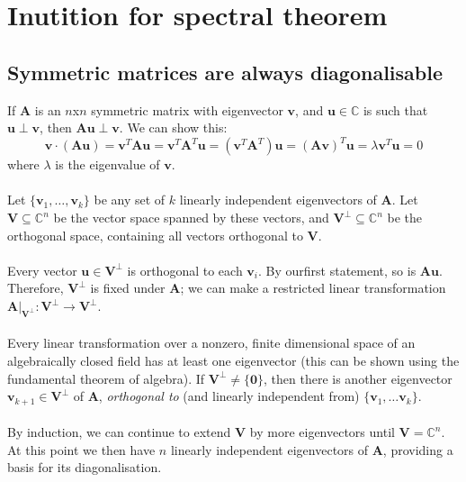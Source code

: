 \documentclass{report}
\begin{document}
\section{Inutition for spectral theorem}
\subsection{Symmetric matrices are always diagonalisable}
If $\bm A$ is an $n$x$n$ symmetric matrix with eigenvector $\bm v$, and $\bm u\in\mathbb{C}$ is such that $\bm u\perp\bm v$, then 
$\bm{Au}\perp\bm v$. We can show this:
\begin{equation*}
\bm v\cdot(\bm{Au})=\bm v^T\bm{Au}=\bm v^T\bm A^T\bm u=(\bm v^T\bm A^T)\bm u=(\bm A\bm v)^T\bm u
=\lambda\bm v^T\bm u=0
\end{equation*}
where $\lambda$ is the eigenvalue of $\bm v$.\\
\vspace{1mm}\\
Let $\{\bm v_1,\ldots,\bm v_k\}$ be any set of $k$ linearly independent eigenvectors of $\bm A$. Let $\bm V\subseteq\mathbb C^n$ be the vector
space spanned by these vectors, and $\bm V^\perp\subseteq\mathbb C^n$ be the orthogonal space, containing all vectors orthogonal to $\bm V$.\\
\vspace{1mm}\\
Every vector $\bm u\in\bm V^\perp$ is orthogonal to each $\bm v_i$. By ourfirst statement, so is $\bm{Au}$. Therefore, $\bm V^\perp$ is fixed under
$\bm A$; we can make a restricted linear transformation $\bm A|_{\bm V^\perp}:\bm V^\perp\to\bm V^\perp$.\\
\vspace{1mm}\\
Every linear transformation over a nonzero, finite dimensional space of an algebraically closed field has at least one eigenvector (this can be 
shown using the fundamental theorem of algebra). If $\bm V^\perp\neq\{\bm 0\}$, then there is another eigenvector $\bm v_{k+1}\in\bm V^\perp$ of
$\bm A$, \textit{orthogonal to} (and linearly independent from) $\{\bm v_1,\ldots\bm v_k\}$.\\
\vspace{1mm}\\
By induction, we can continue to extend $\bm V$ by more eigenvectors until $\bm V=\mathbb C^n$. At this point we then have
$n$ linearly independent eigenvectors of $\bm A$, providing a basis for its diagonalisation.
\end{document}
